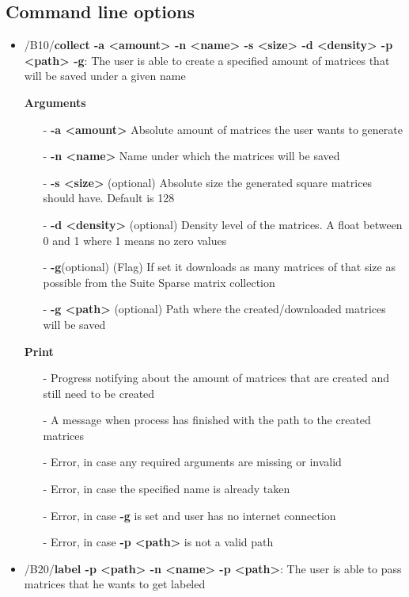 \documentclass[parskip=full]{scrartcl}
\begin{document}
\subsection{Command line options}
\begin{itemize}
\item/B10/\textbf{collect -a <amount> -n <name> -s <size> -d <density> -p <path> -g}:
\newline The user is able to create a specified amount of matrices that will be saved under a given name

\textbf{Arguments}
	\begin{itemize}
	\item[-]\textbf{-a <amount>} Absolute amount of matrices the user wants to generate
	\item[-]\textbf{-n <name>} Name under which the matrices will be saved
	\item[-]\textbf{-s <size>} (optional) Absolute size the generated square matrices should have. Default is 128
	\item[-]\textbf{-d <density>} (optional) Density level of the matrices. A float between 0 and 1 where 1 means no zero values
	\item[-]\textbf{-g}(optional) (Flag) If set it downloads as many matrices of that size as possible from the \gls{Suite Sparse} matrix collection
	\item[-]\textbf{-g <path>} (optional) Path where the created/downloaded matrices will be saved
	\end{itemize}

\textbf{Print}
	\begin{itemize}
	\item[-]Progress notifying about the amount of matrices that are created and still need to be created
	\item[-]A message when process has finished with the path to the created matrices
	\item[-]Error, in case any required arguments are missing or invalid
	\item[-]Error, in case the specified name is already taken
	\item[-]Error, in case \textbf{-g} is set and user has no internet connection
	\item[-]Error, in case \textbf{-p <path>} is not a valid path
	\end{itemize}

\item/B20/\textbf{label -p <path> -n <name> -p <path>}:
\newline The user is able to pass matrices that he wants to get labeled


\end{itemize}
\end{document}

